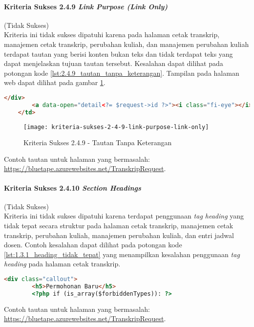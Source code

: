 \paragraph{Kriteria Sukses 2.4.9 \textit{Link Purpose (Link Only)}}
\label{par:kepatuhan_bluetape_kriteria_sukses_2.4.9}
(Tidak Sukses)\\

Kriteria ini tidak sukses dipatuhi karena pada halaman cetak transkrip, manajemen cetak transkrip, perubahan kuliah, dan manajemen perubahan kuliah terdapat tautan yang berisi konten bukan teks dan tidak terdapat teks yang dapat menjelaskan tujuan tautan tersebut. Kesalahan dapat dilihat pada potongan kode \ref{lst:2.4.9_tautan_tanpa_keterangan}. Tampilan pada halaman web dapat dilihat pada gambar \ref{fig:2.4.9_link_purpose_link_only}.

\begin{lstlisting}[frame=single, label={lst:2.4.9_tautan_tanpa_keterangan}, language=HTML, caption=Kriteria Sukses 2.4.9 - Tautan Tanpa Keterangan]
        </div>
        <a data-open="detail<?= $request->id ?>"><i class="fi-eye"></i></a>
    </td>
\end{lstlisting}

\begin{figure}[H]
	\centering  
	\texttt{[image: kriteria-sukses-2-4-9-link-purpose-link-only]}  
    \caption[Kriteria Sukses 2.4.9 - Tautan Tanpa Keterangan]{Kriteria Sukses 2.4.9 - Tautan Tanpa Keterangan}
    \label{fig:2.4.9_link_purpose_link_only}  
\end{figure} 
Contoh tautan untuk halaman yang bermasalah: \url{https://bluetape.azurewebsites.net/TranskripRequest}.

\paragraph{Kriteria Sukses 2.4.10 \textit{Section Headings}}
\label{par:kepatuhan_bluetape_kriteria_sukses_2.4.10}
(Tidak Sukses)\\

Kriteria ini tidak sukses dipatuhi karena terdapat penggunaan \textit{tag heading} yang tidak tepat secara struktur pada halaman cetak transkrip, manajemen cetak transkrip, perubahan kuliah, manajemen perubahan kuliah, dan entri jadwal dosen. Contoh kesalahan dapat dilihat pada potongan kode \ref{lst:1.3.1_heading_tidak_tepat} yang menampilkan kesalahan penggunaan \textit{tag heading} pada halaman cetak transkrip.

\begin{lstlisting}[frame=single, label={lst:2.4.10_heading_tidak_tepat}, language=HTML, caption=Kriteria Sukses 2.4.10 - Penggunaan \textit{Heading} Tidak Tepat]
    <div class="callout">
        <h5>Permohonan Baru</h5>
        <?php if (is_array($forbiddenTypes)): ?>
\end{lstlisting}
Contoh tautan untuk halaman yang bermasalah: \url{https://bluetape.azurewebsites.net/TranskripRequest}.

